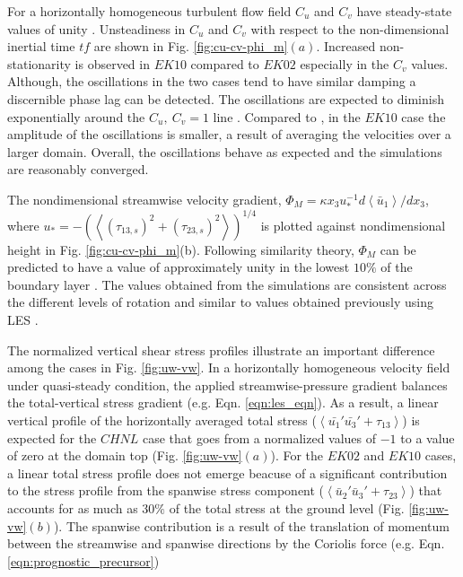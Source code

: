 \documentclass{svjour3}                     %
\begin{document}
\noindent For a horizontally homogeneous turbulent flow field $C_u$ and $C_v$ have steady-state values of unity  \citep{book-garrat-blm}. Unsteadiness in $C_u$ and $C_v$ with respect to the non-dimensional inertial time $tf$ are shown in Fig.  \ref{fig:cu-cv-phi_m}$(a)$. Increased non-stationarity is observed in $EK10$ compared to $EK02$ especially in the $C_v$ values. Although, the oscillations in the two cases tend to have similar damping a discernible phase lag can be detected. The oscillations are expected to diminish  exponentially around the  $C_{u},\ C_{v}=1$ line \citep{book-garrat-blm}. Compared to \citet{andren_brown_qjrm_94}, in the $EK10$ case the amplitude of the oscillations is smaller, a result of averaging the velocities over a larger domain. Overall, the oscillations behave as expected and the simulations are reasonably converged. 

The nondimensional streamwise velocity gradient, $\Phi_M=\kappa x_3 u_*^{-1} d\left < \bar{u}_1 \right >/dx_3$, where $u_*= -(\left < (\tau_{13,s})^2 + ( \tau_{23,s})^2\right >)^{1/4}$ is plotted against nondimensional height in Fig. \ref{fig:cu-cv-phi_m}(b). Following similarity theory, $\Phi_M$ can be predicted to have a value of approximately unity in the lowest $10\%$ of the boundary layer \citep{book-garrat-blm, stoll_blm_2006}. The values obtained from the simulations are consistent across the different levels of rotation and similar to values obtained previously using LES \citep{stoll_blm_2006,Bouzeid_pof_2005,andren_brown_qjrm_94}. 

The normalized vertical shear stress profiles illustrate an important difference among the cases in Fig. \ref{fig:uw-vw}. In a horizontally homogeneous velocity field under quasi-steady condition, the applied streamwise-pressure gradient balances the total-vertical stress gradient (e.g. Eqn. \ref{eqn:les_eqn}). As a result, a linear vertical profile of the horizontally averaged total stress ($\left <\bar{u_1}'\bar{u_3}'+\tau_{13} \right>$)  is expected for the $CHNL$ case that goes from a normalized values of $-1$ to a value of zero at the domain top (Fig. \ref{fig:uw-vw}$(a)$). For the $EK02$ and $EK10$ cases, a linear total stress profile does not emerge beacuse of a significant contribution to the stress profile from  the spanwise stress component ($\left <\bar{u}_{2}'\bar{u}_{3}'+\tau_{23} \right>$) that accounts for as much as $30\%$ of the total stress at the ground level (Fig. \ref{fig:uw-vw}$(b)$). The spanwise contribution is a result of the translation of momentum between the streamwise and spanwise directions by the Coriolis force (e.g. Eqn. \ref{eqn:prognostic_precursor})
\end{document}
